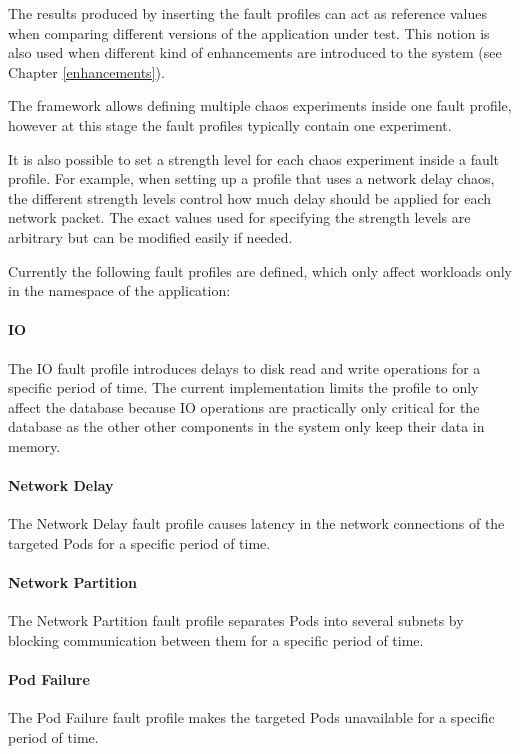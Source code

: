 The results produced by inserting the fault profiles can act as reference values when comparing different versions of the application under test. This notion is also used when different kind of enhancements are introduced to the system (see Chapter \ref{enhancements}).

The framework allows defining multiple chaos experiments inside one fault profile, however at this stage the fault profiles typically contain one experiment. 

It is also possible to set a strength level for each chaos experiment inside a fault profile. For example, when setting up a profile that uses a network delay chaos, the different strength levels control how much delay should be applied for each network packet. The exact values used for specifying the strength levels are arbitrary but can be modified easily if needed.

Currently the following fault profiles are defined, which only affect workloads only in the namespace of the application:

\paragraph{IO} The IO fault profile introduces delays to disk read and write operations for a specific period of time. The current implementation limits the profile to only affect the database because IO operations are practically only critical for the database as the other other components in the system only keep their data in memory.

\paragraph{Network Delay} The Network Delay fault profile causes latency in the network connections of the targeted Pods for a specific period of time.

\paragraph{Network Partition} The Network Partition fault profile separates Pods into several subnets by blocking communication between them for a specific period of time.

\paragraph{Pod Failure} The Pod Failure fault profile makes the targeted Pods unavailable for a specific period of time.

